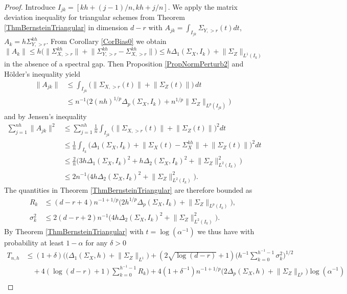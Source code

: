 \documentclass[preprint,aos]{imsart}
\numberwithin{equation}{section}
\theoremstyle{remark}
\providecommand{\norm}[1]{\lVert #1 \rVert}
\renewcommand{\le}{\leqslant}
\begin{document}
\begin{appendix}
\begin{proof}
Introduce $I_{jk}=[kh+(j-1)/n,kh+j/n]$. We apply the matrix deviation inequality for triangular schemes from Theorem \ref{ThmBernsteinTriangular} in dimension $d-r$ with $A_{jk}=\int_{I_{jk}}\Sigma_{Y,>r}(t)dt$, $A_k=h\Sigma_{Y,>r}^{kh}$. From Corollary \ref{CorBias0} we obtain
\[\norm{A_k}\le h\big(\norm{\Sigma_{X,>r}^{kh}}+\norm{\Sigma_{Y,>r}^{kh}-\Sigma_{X,>r}^{kh}}\big)\le h\Delta_1(\Sigma_{X},I_k)+\norm{\Sigma_{Z}}_{L^1(I_k)}
\]
 in the absence of a spectral gap.  Then Proposition \ref{PropNormPerturb2} and   H\"older's inequality yield
\begin{align*}
\norm{A_{jk}} &\le \int_{I_{jk}} \big(\norm{\Sigma_{X,>r}(t)}+\norm{\Sigma_{Z}(t)}\big)\,dt \\
&\le n^{-1}\Big(2(nh)^{1/p}\Delta_p(\Sigma_X,I_{k})+ n^{1/p}\norm{\Sigma_{Z}}_{L^p(I_{jk})}\Big)
\end{align*}
and by Jensen's inequality
\begin{align*}
\sum_{j=1}^{nh} \norm{A_{jk}}^2 &\le \sum_{j=1}^{nh} \frac1n\int_{I_{jk}}\big(\norm{\Sigma_{X,>r}(t)}+ \norm{\Sigma_{Z}(t)}\big)^2 dt\\
&\le \frac1n\int_{I_k} \big(\Delta_1(\Sigma_X,I_{k})+\norm{\Sigma_X(t)-\Sigma_X^{kh}} +\norm{\Sigma_{Z}(t)}\big)^2dt\\
&\le \frac {2}n\Big(3h \Delta_1(\Sigma_X,I_{k})^2+ h \Delta_2(\Sigma_X,I_{k})^2+\norm{\Sigma_{Z}}_{L^2(I_k)}^2 \Big)\\
&\le 2n^{-1}\Big(4h\Delta_2(\Sigma_X,I_k)^2+\norm{\Sigma_{Z}}_{L^2(I_k)}^2\Big).
\end{align*}
The quantities in Theorem \ref{ThmBernsteinTriangular} are therefore bounded as
\begin{align*}
R_k &\le (d-r+4)n^{-1+1/p}\Big(2h^{1/p}\Delta_p(\Sigma_X,I_{k})+\norm{\Sigma_{Z}}_{L^p(I_k)}\Big),\\
\sigma_k^2 &\le 2(d-r+2)n^{-1}\Big(4h\Delta_2(\Sigma_X,I_k)^2+\norm{\Sigma_{Z}}_{L^2(I_k)}^2\Big).
\end{align*}
By Theorem \ref{ThmBernsteinTriangular} with $t=\log(\alpha^{-1})$  we thus have with probability at least $1-\alpha$ for any $\delta>0$
\begin{align*}
T_{n,h}
&\le (1+\delta)\Big(\big(\Delta_1(\Sigma_X,h)+\norm{\Sigma_Z}_{L^1}\big)+(2\sqrt{\log (d-r)}+1)\Big(h^{-1}\sum_{k=0}^{h^{-1}-1}\sigma_k^2\Big)^{1/2}\\
&\quad +4(\log(d-r)+1)\sum_{k=0}^{h^{-1}-1}R_k\Big) + 4(1+\delta^{-1})n^{-1+1/p}\big(2\Delta_p(\Sigma_X,h)+\norm{\Sigma_Z}_{L^p}\big) \log(\alpha^{-1})\\

\end{align*}
\end{proof}
\end{appendix}
\end{document}
